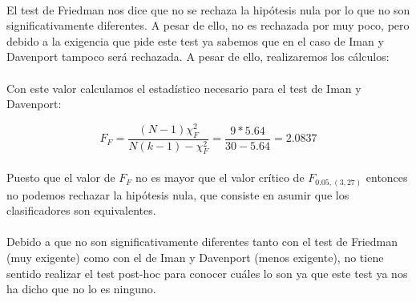 \documentclass[10pt, a4paper,spanish]{article}
\begin{document}
		\paragraph{}
		El test de Friedman nos dice que no se rechaza la hipótesis nula por lo que no son significativamente diferentes. A pesar de ello, no es rechazada por muy poco, pero debido a la exigencia que pide este test ya sabemos que en el caso de Iman y Davenport tampoco será rechazada. A pesar de ello, realizaremos los cálculos:

		\paragraph{}
		Con este valor calculamos el estadístico necesario para el test de Iman y Davenport:

		\[F_{F}= \frac{(N-1)\chi_{F}^2}{N(k-1)-\chi_{F}^2} = \frac{9 * 5.64}{30-5.64} = 2.0837 \]

		\paragraph{}
		Puesto que el valor de $F_{F}$ no es mayor que el valor crítico de $F_{0.05, (3,27)}$ entonces no podemos rechazar la hipótesis nula, que consiste en asumir que los clasificadores son equivalentes.

		\paragraph{}
		Debido a que no son significativamente diferentes tanto con el test de Friedman (muy exigente) como con el de Iman y Davenport (menos exigente), no tiene sentido realizar el test post-hoc para conocer cuáles lo son ya que este test ya nos ha dicho que no lo es ninguno.
\end{document}
